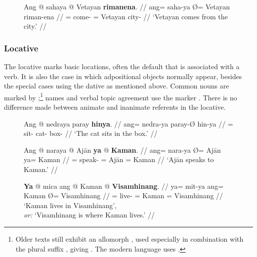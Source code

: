 \begin{figure}[h]
\ex\label{ex:genabl}%
\begingl
	\gla Ang @ sahaya {} @ Vetayan \textbf{rimanena}. //
	\glb ang= saha-ya Ø= Vetayan riman-ena //
	\glc \AgtT{}= come-\TsgM{} \Top{}= Vetayan city-\Gen{} //
	\glft `Vetayan comes from the city.' //
\endgl
\xe
\end{figure}


\subsubsection{Locative}

The locative marks basic locations, often the default that is associated with a
verb. It is also the case in which adpositional objects normally appear,
besides the special cases using the dative as mentioned above.
Common nouns are marked by ;\footnote{Older texts still exhibit
an allomorph , used especially in combination with the plural
suffix , giving . The modern language uses
.} names and verbal topic agreement use the marker 
. There is no difference made between animate and inanimate 
referents in the locative.

\begin{figure}
\pex\label{ex:locplain}
\a\label{ex:locnedra}\begingl
	\gla Ang @ nedraya paray \textbf{hinya}. //
	\glb ang= nedra-ya paray-Ø hin-ya //
	\glc \AgtT{}= sit-\TsgM{} cat-\Top{} box-\Loc{} //
	\glft `The cat sits in the box.' //
\endgl

\a\label{ex:locnara}\begingl
	\gla Ang @ naraya {} @ Ajān \textbf{ya} @ \textbf{Kaman}. //
	\glb ang= nara-ya Ø= Ajān ya= Kaman //
	\glc \AgtT{}= speak-\TsgM{} \Top{}= Ajān \Loc{}= Kaman //
	\glft `Ajān speaks to Kaman.' //
\endgl

\a\label{ex:locmit}\begingl
	\gla \textbf{Ya} @ mica ang @ Kaman {} @ \textbf{Visamhinang}. //
	\glb ya= mit-ya ang= Kaman Ø= Visamhinang //
	\glc \LocT{}= live-\TsgM{} \Aarg{}= Kaman \Top{}= Visamhinang //
	\glft `Kaman lives in Visamhinang',\\
		\textit{or:} `Visamhinang is where Kaman lives.' //
\endgl
\xe
\end{figure}

